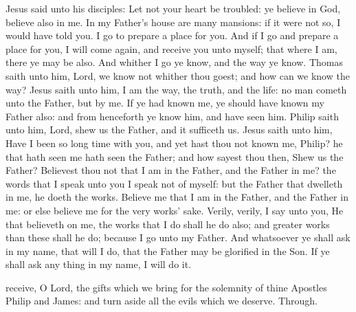 
 Jesus said unto his disciples: Let not your heart be troubled: ye believe in God, believe also in me. In my Father's house are many mansions: if it were not so, I would have told you. I go to prepare a place for you. And if I go and prepare a place for you, I will come again, and receive you unto myself; that where I am, there ye may be also. And whither I go ye know, and the way ye know. Thomas saith unto him, Lord, we know not whither thou goest; and how can we know the way? Jesus saith unto him, I am the way, the truth, and the life: no man cometh unto the Father, but by me. If ye had known me, ye should have known my Father also: and from henceforth ye know him, and have seen him. Philip saith unto him, Lord, shew us the Father, and it sufficeth us. Jesus saith unto him, Have I been so long time with you, and yet hast thou not known me, Philip? he that hath seen me hath seen the Father; and how sayest thou then, Shew us the Father? Believest thou not that I am in the Father, and the Father in me? the words that I speak unto you I speak not of myself: but the Father that dwelleth in me, he doeth the works. Believe me that I am in the Father, and the Father in me: or else believe me for the very works' sake. Verily, verily, I say unto you, He that believeth on me, the works that I do shall he do also; and greater works than these shall he do; because I go unto my Father. And whatsoever ye shall ask in my name, that will I do, that the Father may be glorified in the Son. If ye shall ask any thing in my name, I will do it.


\secret
{} receive, O Lord, the gifts which we bring for the solemnity of thine Apostles Philip and James: and turn aside all the evils which we deserve. Through.


